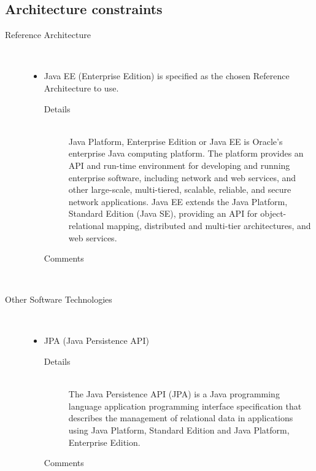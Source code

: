 \documentclass[10pt]{article}
\begin{document}
\clearpage

\subsection{Architecture constraints} %

\begin{description}
		\item[Reference Architecture] \hfill \\
		 	 \begin{itemize}	
				\item Java EE (Enterprise Edition) is specified as the chosen Reference Architecture to use.
					\begin{description}
						\item[Details] \hfill \\
							Java Platform, Enterprise Edition or Java EE is Oracle's enterprise Java computing platform. The platform provides an
							 API and run-time environment for developing and running enterprise software, including network and web services, and
							 other large-scale, multi-tiered, scalable, reliable, and secure network applications. Java EE extends the Java Platform, 
							Standard Edition (Java SE),  providing an API for object-relational mapping, distributed and multi-tier architectures, and
							 web services. 
						\item[Comments]\hfill \\		
					\end{description}
			\end{itemize}
		\item[Other Software Technologies] \hfill \\
			\begin{itemize}
				\item JPA (Java Persistence API)
					\begin{description}
						\item[Details] \hfill \\
							The Java Persistence API (JPA) is a Java programming language application programming interface specification that
							 describes the management of relational data in applications using Java Platform, Standard Edition and Java Platform, Enterprise Edition.
						\item[Comments]\hfill \\
							

\end{description}
\end{itemize}
\end{description}
\end{document}
